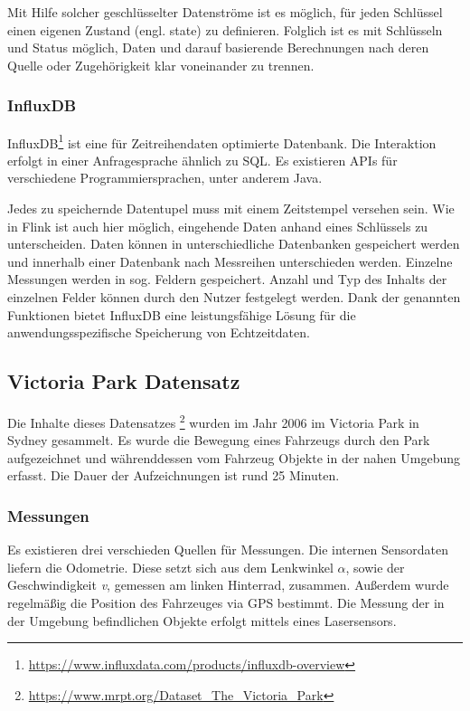 \documentclass[11pt]{article}
\begin{document}
Mit Hilfe solcher geschlüsselter Datenströme ist es möglich, für jeden Schlüssel einen eigenen Zustand (engl. state) zu definieren. Folglich ist es mit Schlüsseln und Status möglich, Daten und darauf basierende Berechnungen nach deren Quelle oder Zugehörigkeit klar voneinander zu trennen.

\subsubsection{InfluxDB}
InfluxDB\footnote{\url{https://www.influxdata.com/products/influxdb-overview}} ist eine für Zeitreihendaten optimierte Datenbank. Die Interaktion erfolgt in einer Anfragesprache ähnlich zu SQL. Es existieren APIs für verschiedene Programmiersprachen, unter anderem Java. 

Jedes zu speichernde Datentupel muss mit einem Zeitstempel versehen sein. Wie in Flink ist auch hier möglich, eingehende Daten anhand eines Schlüssels zu unterscheiden. Daten können in unterschiedliche Datenbanken gespeichert werden und innerhalb einer Datenbank nach Messreihen unterschieden werden. Einzelne Messungen werden in sog. Feldern gespeichert. Anzahl und Typ des Inhalts der einzelnen Felder können durch den Nutzer festgelegt werden. Dank der genannten Funktionen bietet InfluxDB eine leistungsfähige Lösung für die anwendungsspezifische Speicherung von Echtzeitdaten.

\subsection{Victoria Park Datensatz}
Die Inhalte dieses Datensatzes \footnote{\url{https://www.mrpt.org/Dataset_The_Victoria_Park}} wurden im Jahr 2006 im Victoria Park in Sydney gesammelt. Es wurde die Bewegung eines Fahrzeugs durch den Park aufgezeichnet und währenddessen vom Fahrzeug Objekte in der nahen Umgebung erfasst. Die Dauer der Aufzeichnungen ist rund 25 Minuten.

\subsubsection{Messungen}
Es existieren drei verschieden Quellen für Messungen. Die internen Sensordaten liefern die Odometrie. Diese setzt sich aus dem Lenkwinkel \(\alpha\), sowie der Geschwindigkeit \textit{v}, gemessen am linken Hinterrad, zusammen. Außerdem wurde regelmäßig die Position des Fahrzeuges via GPS bestimmt. Die Messung der in der Umgebung befindlichen Objekte erfolgt mittels eines Lasersensors.
\end{document}
